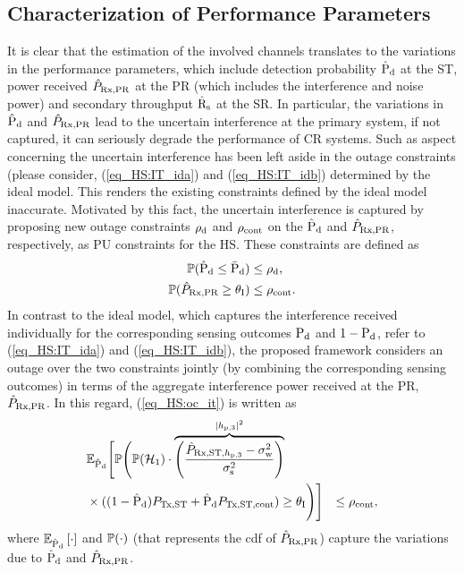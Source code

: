 \subsection{Characterization of Performance Parameters}
It is clear that the estimation of the involved channels translates to the variations in the performance parameters, which include detection probability $\hat{\text{P}}_{\text{d}}$ at the ST, power received $\hat{P}_{\text{Rx,PR}}$ at the PR (which includes the interference and noise power) and secondary throughput $\hat{\text{{R}}}_{\text{s}}$ at the SR. In particular, the variations in $\hat{\text{P}}_{\text{d}}$ and $\hat{P}_{\text{Rx,PR}}$ lead to the uncertain interference at the primary system, if not captured, it can seriously degrade the performance of CR systems. Such as aspect concerning the uncertain interference has been left aside in the outage constraints (please consider, (\ref{eq_HS:IT_ida}) and (\ref{eq_HS:IT_idb}) determined by the ideal model. This renders the existing constraints defined by the ideal model inaccurate. 
Motivated by this fact, the uncertain interference is captured by proposing new outage constraints $\rho_{\text{d}}$ and $\rho_{\text{cont}}$ on the $\hat{\text{P}}_{\text{d}}$ and $\hat{P}_{\text{Rx,PR}}$, respectively, as PU constraints for the HS. These constraints are defined as  
\begin{align}
\mathbb P(\hat{\text{P}}_{\text{d}} \le \bar{\text{P}}_{\text{d}}) &\le \rho_{\text{d}} \label{eq_HS:oc_pd}, \\
\mathbb P(\hat{P}_{\text{Rx,PR}} \ge \theta_{\text{I}}) &\le \rho_{\text{cont}} \label{eq_HS:oc_it}.
\end{align}   
In contrast to the ideal model, which captures the interference received individually for the corresponding sensing outcomes $\text{P}_{\text{d}}$ and  $1- \text{P}_{\text{d}}$, refer to (\ref{eq_HS:IT_ida}) and (\ref{eq_HS:IT_idb}), the proposed framework considers an outage over the two constraints jointly (by combining the corresponding sensing outcomes) in terms of the aggregate interference power received at the PR, $\hat{P}_{\text{Rx,PR}}$. In this regard, (\ref{eq_HS:oc_it}) is written as 
\begin{align}
& \mathbb{E}_{\hat{\text{P}}_{\text{d}}} \Bigg[ \mathbb P \Bigg( \mathbb P(\mathcal{H}_1) \cdot \smash[b]{\overbrace{\left( \frac{\hat{P}_{\text{Rx,ST,$h_{\text{p,3}}$}} - \sigma^2_{\text{w}}}{\sigma^2_{\text{s}}} \right)}^{|h_{\text{p,3}}|^2}} \nonumber \\ & \times ((1 - \hat{\text{P}}_{\text{d}}) P_{\text{Tx,ST}} + \hat{\text{P}}_{\text{d}} P_{\text{Tx,ST,cont}}) \ge \theta_{\text{I}} \Bigg) \Bigg] &\le \rho_{\text{cont}} \label{eq_HS:oc_it_def}, 
\end{align}
where ${\mathbb E}_{\hat{\text{P}}_{\text{d}}}\left[ \cdot \right]$ and $\mathbb P(\cdot)$ (that represents the cdf of $\hat{P}_{\text{Rx,PR}}$) capture the variations due to $\hat{\text{P}}_{\text{d}}$ and $\hat{P}_{\text{Rx,PR}}$. 
